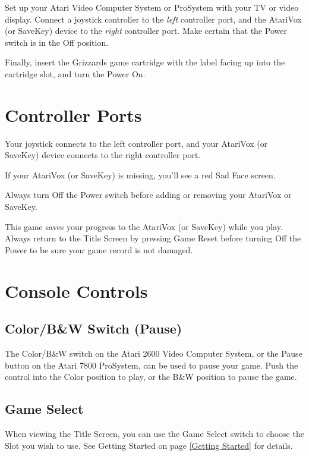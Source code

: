 \documentclass[10pt,twoside,openright]{memoir}
\begin{document}
Set up  your Atari Video  Computer System or  ProSystem with your  TV or
video  display.  Connect  a   joystick  controller  to  the  \emph{left}
controller  port,   and  the  AtariVox   (or  SaveKey)  device   to  the
\emph{right} controller port.  Make certain that the Power  switch is in
the Off position.

Finally, insert the Grizzards game cartridge with the
label facing up into the cartridge slot, and turn the Power On.

\section{Controller Ports}

Your joystick  connects to the  left controller port, and  your AtariVox
(or SaveKey) device connects to the right controller port.

If  your  AtariVox  (or  SaveKey)  is missing,  you'll  see  a  red  Sad
Face screen.

Always   turn  Off   the  Power   switch  before   adding  or   removing
your AtariVox or SaveKey.

This game  saves your progress  to the  AtariVox (or SaveKey)  while you
play. Always  return to the Title  Screen by pressing Game  Reset before
turning Off the Power to be sure your game record is not damaged.

\section{Console Controls}

\subsection{Color/B\&W Switch (Pause)}

The Color/B\&W switch on the Atari  2600 Video Computer System, or the
Pause button  on the Atari 7800  ProSystem, can be used  to pause your
game. Push  the control into the  Color position to play,  or the B\&W
position to pause the game.

\subsection{Game Select}

When viewing the Title Screen, you can use the Game Select switch to
choose the Slot you wish to use.  See Getting Started on page
\ref{Getting Started} for details.
\end{document}
